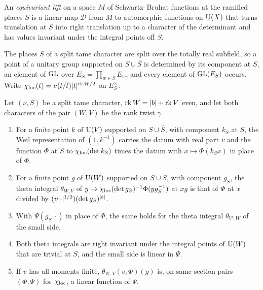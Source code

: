 An \emph{equivariant lift} on a space $M$ of Schwartz--Bruhat functions at the ramified places $S$ is a linear map $\mathcal D$ from $M$ to automorphic functions on $\operatorname{U}(X)$ that turns translation
at $S$ into right translation up to a character of the determinant and has values invariant under the integral points off $S$.

The places $S$ of a split tame character are split over the totally real subfield, so a point of a unitary group supported on $S\cup\bar S$ is determined by its component at $S$, an element of
$\operatorname{GL}$ over $E_S=\prod_{w\in S}E_w$, and every element of $\operatorname{GL}(E_S)$ occurs. Write $\chi_{\rm loc}(t)=\nu(t/\bar t)\lvert t\rvert^{\operatorname{rk}W/2}$ on $E_S^\times$.

\begin{lemma}\label{lem:translation-laws}
Let $(\nu,S)$ be a split tame character, $\operatorname{rk}W=\lvert b\rvert+\operatorname{rk}V$ even, and let both characters of the pair $(W,V)$ be the rank twist $\gamma$.
\begin{enumerate}[label=\textup{(\alph*)}]
\item For a finite point $k$ of $\operatorname{U}(V)$ supported on $S\cup\bar S$, with component $k_S$ at $S$, the Weil representation of $(1,k^{-1})$ carries the datum with real part $v$ and the function $\Phi$ at $S$
to $\chi_{\rm loc}(\det k_S)$ times the datum with $x\mapsto\Phi(k_Sx)$ in place of $\Phi$.
\item For a finite point $g$ of $\operatorname{U}(W)$ supported on $S\cup\bar S$, with component $g_S$, the theta integral $\theta_{W,V}$ of $y\mapsto\chi_{\rm loc}(\det g_S)^{-1}\Phi(yg_S^{-1})$ at $xg$ is that of $\Phi$ at
$x$ divided by $(\upsilon\lvert \cdot\rvert^{1/2})(\det g_S)^{\lvert b\rvert}$.
\item With $\Psi(g_S\,\cdot)$ in place of $\Phi$, the same holds for the theta integral $\theta_{V',W}$ of the small side.
\item Both theta integrals are right invariant under the integral points of $\operatorname{U}(W)$ that are trivial at $S$, and the small side is linear in $\Psi$.
\item If $v$ has all moments finite, $\theta_{W,V}(v,\Phi)(g)$ is, on same-section pairs $(\Phi,\Psi)$ for $\chi_{\rm loc}$, a linear function of $\Psi$.
\end{enumerate}
\end{lemma}


